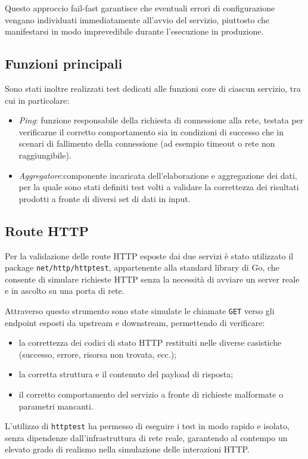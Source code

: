 Questo approccio fail-fast garantisce che eventuali errori di configurazione vengano individuati immediatamente all'avvio del servizio, piuttosto che manifestarsi in modo imprevedibile durante l'esecuzione in produzione.

\subsection{Funzioni principali}
Sono stati inoltre realizzati test dedicati alle funzioni core di ciascun servizio, tra cui in particolare:
\begin{itemize}
    \item \emph{Ping}: funzione responsabile della richiesta di connessione alla rete, testata per verificarne il corretto comportamento sia in condizioni di successo che in scenari di fallimento della connessione (ad esempio timeout o rete non raggiungibile).
    \item \emph{Aggregatore}:componente incaricata dell'elaborazione e aggregazione dei dati, per la quale sono stati definiti test volti a validare la correttezza dei risultati prodotti a fronte di diversi set di dati in input.
\end{itemize}

\subsection{Route HTTP}
Per la validazione delle route \ac{HTTP} esposte dai due servizi è stato utilizzato il package \texttt{net/http/httptest}, appartenente alla standard library di Go, che consente di simulare richieste \ac{HTTP} senza la necessità di avviare un server reale e in ascolto su una porta di rete.

Attraverso questo strumento sono state simulate le chiamate \texttt{GET} verso gli endpoint esposti da upstream e downstream, permettendo di verificare:
\begin{itemize}
    \item la correttezza dei codici di stato \ac{HTTP} restituiti nelle diverse casistiche (successo, errore, risorsa non trovata, ecc.);
    \item la corretta struttura e il contenuto del payload di risposta;
    \item il corretto comportamento del servizio a fronte di richieste malformate o parametri mancanti.
\end{itemize}

L'utilizzo di \texttt{httptest} ha permesso di eseguire i test in modo rapido e isolato, senza dipendenze dall'infrastruttura di rete reale, garantendo al contempo un elevato grado di realismo nella simulazione delle interazioni \ac{HTTP}.

